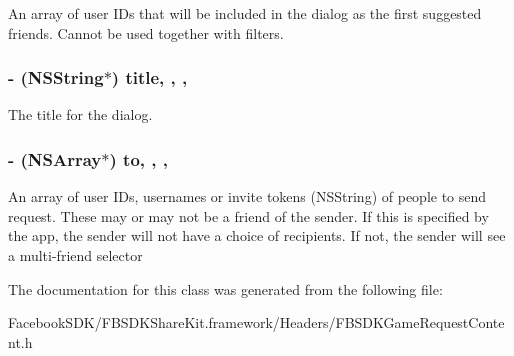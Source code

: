 An array of user I\-Ds that will be included in the dialog as the first suggested friends. Cannot be used together with filters. \hypertarget{interface_f_b_s_d_k_game_request_content_ae626589f2d4e7d36444d34a819989cef}{
\subsubsection[{title}]{\setlength{\rightskip}{0pt plus 5cm}-\/ (N\-S\-String$\ast$) title\hspace{0.3cm}{\ttfamily [read]}, {\ttfamily [write]}, {\ttfamily [nonatomic]}, {\ttfamily [copy]}}}\label{interface_f_b_s_d_k_game_request_content_ae626589f2d4e7d36444d34a819989cef}
The title for the dialog. \hypertarget{interface_f_b_s_d_k_game_request_content_a2598b30779626fd9afdbac65c137b99b}{
\subsubsection[{to}]{\setlength{\rightskip}{0pt plus 5cm}-\/ (N\-S\-Array$\ast$) to\hspace{0.3cm}{\ttfamily [read]}, {\ttfamily [write]}, {\ttfamily [nonatomic]}, {\ttfamily [copy]}}}\label{interface_f_b_s_d_k_game_request_content_a2598b30779626fd9afdbac65c137b99b}
An array of user I\-Ds, usernames or invite tokens (N\-S\-String) of people to send request.  These may or may not be a friend of the sender. If this is specified by the app, the sender will not have a choice of recipients. If not, the sender will see a multi-\/friend selector 

The documentation for this class was generated from the following file\-:\begin{DoxyCompactItemize}
\item 
Facebook\-S\-D\-K/\-F\-B\-S\-D\-K\-Share\-Kit.\-framework/\-Headers/F\-B\-S\-D\-K\-Game\-Request\-Content.\-h\end{DoxyCompactItemize}
